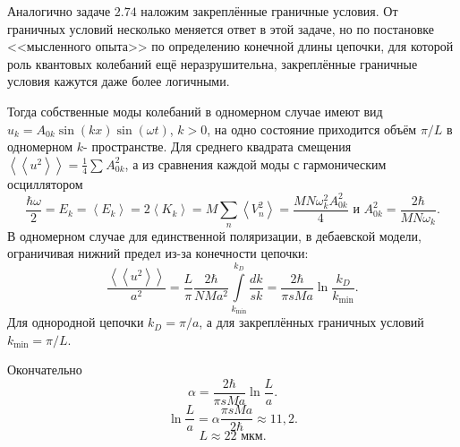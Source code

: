 \documentclass[a4paper]{article}
\begin{document}
\begin{hiProb}[2.75]
\end{hiProb}
\begin{sol}
	Аналогично задаче $2.74$
	наложим закреплённые граничные условия.
	От граничных условий несколько меняется
	ответ в этой задаче, но по постановке
	<<мысленного опыта>> по определению
	конечной длины цепочки, для которой
	роль квантовых колебаний
	ещё неразрушительна, закреплённые
	граничные условия кажутся даже более
	логичными.

	Тогда собственные моды колебаний в одномерном
	случае имеют вид $u_k= A_{0k} \sin (kx)
	\sin (\omega t)$, $k>0$, на одно
	состояние приходится объём $\pi /L$ в одномерном
	$k$- пространстве. Для среднего квадрата
	смещения $\left<\left<u^2 \right>  \right> =
	\frac{1}{4} \sum_{}^{} A_{0k}^2$, а из
	сравнения каждой моды с гармоническим
	осциллятором
	\[
	\frac{\hbar  \omega}{2}= E_k =
	\left<E_k \right> = 2 \left<K_k \right> =
	M \sum_{n}^{} \left< V_n^2 \right> =
	\frac{MN \omega_k^2 A_{0k}^2}{4} \text{ и }
	A_{0k}^2= \frac{2\hbar }{MN\omega_k}
	.\] 
	В одномерном случае для единственной
	поляризации, в дебаевской модели,
	ограничивая нижний предел из-за конечности
	цепочки:
	\[
	\frac{\left<\left<u^2 \right>  \right> }{a^2}
	=\frac{L}{\pi} \frac{2 \hbar }{N Ma^2}
	\int\limits_{k_{\min}}^{k_D} \frac{dk}{sk}=
	\frac{2 \hbar }{\pi s Ma} \ln \frac{k_D}{k_{\min}}
	.\] 
	Для однородной цепочки $k_D= \pi /a$, а 
	для закреплённых граничных условий
	$k_{\min}= \pi /L$.

	Окончательно
	\[
	\alpha= \frac{2\hbar }{\pi s M a}\ln \frac{L}{a}
	.\] 
	\[
	\ln \frac{L}{a}= \alpha \frac{\pi s Ma}{2\hbar } \approx 11,2
	.\] 
	\[
	L \approx 22 \text{ мкм}
	.\] 
\end{sol}
\end{document}
